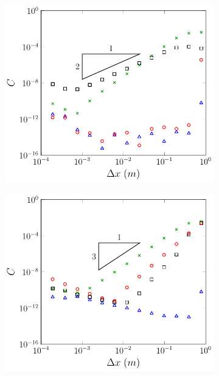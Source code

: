 \begin{figure}
\begin{subfigure}{0.5\textwidth}
		\vspace{0.3cm}
	\end{subfigure}
	\begin{subfigure}{0.5\textwidth}
		\includegraphics[width=\textwidth]{./chp5/figures/Analytic/Soliton/C1/FEVM2.pdf}
		\vspace{0.3cm}
	\end{subfigure}%
	\begin{subfigure}{0.5\textwidth}
		\includegraphics[width=\textwidth]{./chp5/figures/Analytic/Soliton/C1/FDVM3.pdf}

\end{subfigure}
\end{figure}
